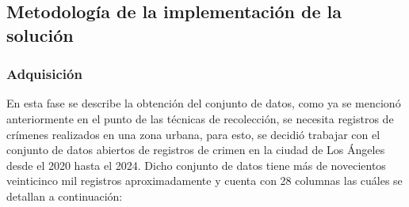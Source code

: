 \subsection{Metodología de la implementación de la solución}
\subsubsection{Adquisición}
En esta fase se describe la obtención del conjunto de datos, como ya se mencionó anteriormente en el punto de las técnicas de recolección, se necesita registros de crímenes realizados en una zona urbana, para esto, se decidió trabajar con el conjunto de datos abiertos de registros de crimen en la ciudad de Los Ángeles desde el 2020 hasta el 2024. Dicho conjunto de datos tiene más de novecientos veinticinco mil registros aproximadamente y cuenta con 28 columnas las cuáles se detallan a continuación:


